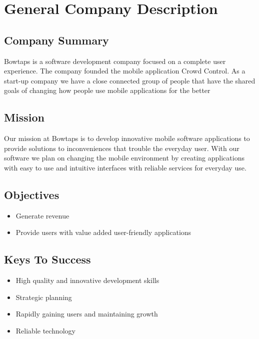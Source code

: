 

\chapter{General Company Description}


\section{Company Summary}

Bowtaps is a software development company focused on a complete user experience. The company founded the mobile application Crowd Control. As a start-up company we have a close connected group of people that have the shared goals of changing how people use mobile applications for the better

\section{Mission}

Our mission at Bowtaps is to develop innovative mobile software applications to provide solutions to inconveniences that trouble the everyday user. With our software we plan on changing the mobile environment by creating applications with easy to use and  intuitive interfaces with reliable services for everyday use.

\section{Objectives}

	\begin{itemize}
	\item Generate revenue
	\item Provide users with value added user-friendly applications
	\end{itemize}


\section{Keys To Success}

	\begin{itemize}
	\item High quality and innovative development skills
	\item Strategic planning 
	\item Rapidly gaining users and maintaining growth 
	\item Reliable technology
	\end{itemize}


